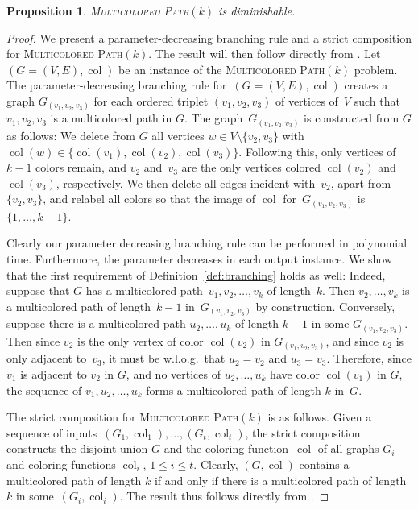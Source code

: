 \documentclass[11pt,a4,USenglish]{article}
\newcommand{\prob}[1]{\textsc{#1}}
\newcommand{\pprob}[2]{\prob{#1}$(#2)$}
\DeclareMathOperator{\col}{col}
\theoremstyle{definition}
\theoremstyle{plain}
\newtheorem{proposition}{Proposition}
\theoremstyle{remark}
\begin{document}
\begin{proposition}
\label{lem:multicoloredpathk}
\pprob{Multicolored Path}{k} is diminishable.
\end{proposition}
\begin{proof}
We present a parameter-decreasing branching rule and a strict composition for \pprob{Multicolored Path}{k}. The result will then follow directly from . 
Let $(G=(V,E),\col)$ be an instance of the \pprob{Multicolored Path}{k} problem. 
The parameter-decreasing branching rule for~$(G=(V,E),\col)$ creates a graph $G_{(v_1,v_2,v_3)}$ for each ordered triplet $(v_1,v_2,v_3)$ of vertices of~$V$ such that $v_1,v_2,v_3$ is a multicolored path in $G$. 
%
The graph~$G_{(v_1,v_2,v_3)}$ is constructed from $G$ as follows: We delete from $G$ all vertices $w\in V\setminus\{v_2,v_3\}$ with~$\col(w)\in\{\col(v_1),\col(v_2),\col(v_3)\}$. 
Following this, only vertices of $k-1$ colors remain, and $v_2$ and~$v_3$ are the only vertices colored $\col(v_2)$ and $\col(v_3)$, respectively. 
We then delete all edges incident with~$v_2$, apart from $\{v_2,v_3\}$, and relabel all colors so that the image of $\col$ for~$G_{(v_1,v_2,v_3)}$ is~$\{1,\ldots,k-1\}$.

Clearly our parameter decreasing branching rule can be performed in polynomial time. Furthermore, the parameter decreases in each output instance. 
We show that the first requirement of Definition~\ref{def:branching} holds as well: Indeed, suppose that $G$ has a multicolored path~$v_1,v_2,\ldots,v_k$ of length~$k$. 
Then $v_2,\ldots,v_k$ is a multicolored path of length~$k-1$ in~$G_{(v_1,v_2,v_3)}$ by construction. 
Conversely, suppose there is a multicolored path $u_2,\ldots,u_k$ of length $k-1$ in some $G_{(v_1,v_2,v_3)}$.  
Then since $v_2$ is the only vertex of color $\col(v_2)$ in $G_{(v_1,v_2,v_3)}$, and since $v_2$ is only adjacent to~$v_3$, it must be w.l.o.g.\ that $u_2=v_2$ and $u_3=v_3$. Therefore, since $v_1$ is adjacent to $v_2$ in $G$, and no vertices of $u_2,\ldots,u_k$ have color $\col(v_1)$ in $G$, the sequence of $v_1,u_2,\ldots,u_k$ forms a multicolored path of length $k$ in~$G$.

The strict composition for \pprob{Multicolored Path}{k} is as follows. 
Given a sequence of inputs~$(G_1,\col_1),\ldots,(G_t,\col_t)$, the strict composition constructs the disjoint union $G$ and the coloring function~$\col$ of all graphs $G_i$ and coloring functions $\col_i$, $1\leq i\leq t$. 
Clearly, $(G,\col)$ contains a multicolored path of length $k$ if and only if there is a multicolored path of length $k$ in some~$(G_i,\col_i)$. The result thus follows directly from .
\end{proof}
\end{document}
